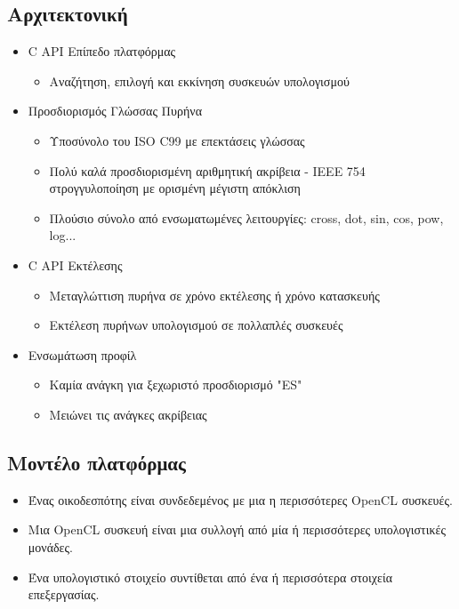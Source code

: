 \subsection{Αρχιτεκτονική}
\begin{itemize}[leftmargin=*]
\item C API Επίπεδο πλατφόρμας
	\begin{itemize}
	\item Αναζήτηση, επιλογή και εκκίνηση συσκευών υπολογισμού
	\end{itemize}
\item Προσδιορισμός Γλώσσας Πυρήνα
	\begin{itemize}
	\item Υποσύνολο του ISO C99 με επεκτάσεις γλώσσας
	\item Πολύ καλά προσδιορισμένη αριθμητική ακρίβεια - IEEE 754 στρογγυλοποίηση με ορισμένη μέγιστη απόκλιση
	\item Πλούσιο σύνολο από ενσωματωμένες λειτουργίες: cross, dot, sin, cos, pow, log...
	\end{itemize}
\item C API Εκτέλεσης
	\begin{itemize}
	\item Μεταγλώττιση πυρήνα σε χρόνο εκτέλεσης ή χρόνο κατασκευής
	\item Εκτέλεση πυρήνων υπολογισμού σε πολλαπλές συσκευές
	\end{itemize}
\item Ενσωμάτωση προφίλ
	\begin{itemize}
	\item Καμία ανάγκη για ξεχωριστό προσδιορισμό "ES"
	\item Μειώνει τις ανάγκες ακρίβειας
	\end{itemize}
\end{itemize}
\subsection{Μοντέλο πλατφόρμας}
\begin{itemize}
\item Ένας οικοδεσπότης είναι συνδεδεμένος με μια η περισσότερες OpenCL συσκευές.
\item Μια OpenCL συσκευή είναι μια συλλογή από μία ή περισσότερες υπολογιστικές μονάδες.
\item Ένα υπολογιστικό στοιχείο συντίθεται από ένα ή περισσότερα στοιχεία επεξεργασίας.
\end{itemize}
